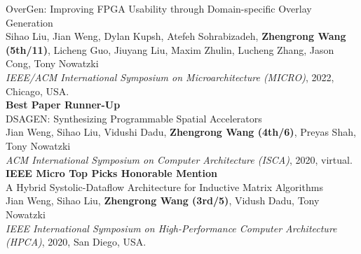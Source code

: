 \documentclass[a4paper]{article}
\newenvironment{changemargin}[2]{%
  \begin{list}{}{%
    \setlength{\topsep}{0pt}%
    \setlength{\leftmargin}{#1}%
    \setlength{\rightmargin}{#2}%
    \setlength{\listparindent}{\parindent}%
    \setlength{\itemindent}{\parindent}%
    \setlength{\parsep}{\parskip}%
  }%
  \item[]}{\end{list}
}
\newenvironment{body} {
	\vspace*{-16pt}
	\begin{changemargin}{-0.5in}{-0.5in}
  }	
	{\end{changemargin}
}
\begin{document}
\begin{body}
	OverGen: Improving FPGA Usability through Domain-specific Overlay Generation\\
	Sihao Liu, Jian Weng, Dylan Kupsh, Atefeh Sohrabizadeh, \textbf{Zhengrong Wang (5th/11)}, Licheng Guo, Jiuyang Liu, Maxim Zhulin, Lucheng Zhang, Jason Cong, Tony Nowatzki \\
	\emph{IEEE/ACM International Symposium on Microarchitecture (MICRO)}, 2022, Chicago, USA.\\
	\textbf{Best Paper Runner-Up} \\
	\vspace{6pt}
	DSAGEN: Synthesizing Programmable Spatial Accelerators \\
	Jian Weng, Sihao Liu, Vidushi Dadu, \textbf{Zhengrong Wang (4th/6)}, Preyas Shah, Tony Nowatzki \\
	\emph{ACM International Symposium on Computer Architecture (ISCA)}, 2020, virtual.\\
	\textbf{IEEE Micro Top Picks Honorable Mention}\\
	\vspace{6pt}
	A Hybrid Systolic-Dataflow Architecture for Inductive Matrix Algorithms\\
	Jian Weng, Sihao Liu, \textbf{Zhengrong Wang (3rd/5)}, Vidush Dadu, Tony Nowatzki \\
	\emph{IEEE International Symposium on High-Performance Computer Architecture (HPCA)}, 2020, San Diego, USA.\\
\end{body}

\smallskip
\smallskip

\end{document}
